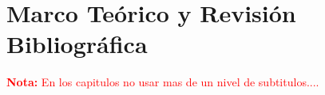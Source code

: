 \chapter{Marco Teórico y Revisión Bibliográfica}
\label{c2} %

\textcolor{red}{\textbf{Nota: }En los capitulos no usar mas de un nivel de subtitulos....}






